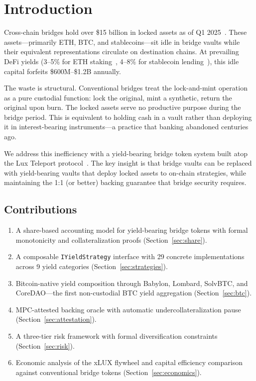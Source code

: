 \section{Introduction}
\label{sec:intro}

Cross-chain bridges hold over \$15 billion in locked assets as of Q1 2025~\cite{defillama2025}. These assets---primarily ETH, BTC, and stablecoins---sit idle in bridge vaults while their equivalent representations circulate on destination chains. At prevailing DeFi yields (3--5\% for ETH staking~\cite{lidofinance}, 4--8\% for stablecoin lending~\cite{aavev3}), this idle capital forfeits \$600M--\$1.2B annually.

The waste is structural. Conventional bridges treat the lock-and-mint operation as a pure custodial function: lock the original, mint a synthetic, return the original upon burn. The locked assets serve no productive purpose during the bridge period. This is equivalent to holding cash in a vault rather than deploying it in interest-bearing instruments---a practice that banking abandoned centuries ago.

We address this inefficiency with a yield-bearing bridge token system built atop the Lux Teleport protocol~\cite{luxteleport}. The key insight is that bridge vaults can be replaced with yield-bearing vaults that deploy locked assets to on-chain strategies, while maintaining the 1:1 (or better) backing guarantee that bridge security requires.

\subsection{Contributions}

\begin{enumerate}[nosep,leftmargin=1.5em]
  \item A share-based accounting model for yield-bearing bridge tokens with formal monotonicity and collateralization proofs (Section~\ref{sec:share}).
  \item A composable \texttt{IYieldStrategy} interface with 29 concrete implementations across 9 yield categories (Section~\ref{sec:strategies}).
  \item Bitcoin-native yield composition through Babylon, Lombard, SolvBTC, and CoreDAO---the first non-custodial BTC yield aggregation (Section~\ref{sec:btc}).
  \item MPC-attested backing oracle with automatic undercollateralization pause (Section~\ref{sec:attestation}).
  \item A three-tier risk framework with formal diversification constraints (Section~\ref{sec:risk}).
  \item Economic analysis of the xLUX flywheel and capital efficiency comparison against conventional bridge tokens (Section~\ref{sec:economics}).
\end{enumerate}

